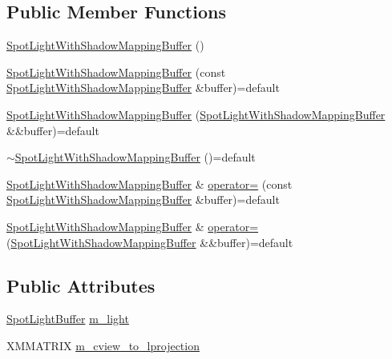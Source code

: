 \subsection*{Public Member Functions}
\begin{DoxyCompactItemize}
\item 
\hyperlink{structmage_1_1_spot_light_with_shadow_mapping_buffer_a96d597bc25801b19e38d3eefa0d662f1}{Spot\+Light\+With\+Shadow\+Mapping\+Buffer} ()
\item 
\hyperlink{structmage_1_1_spot_light_with_shadow_mapping_buffer_aa9078fd9b347d633b48fb8bbb330d54e}{Spot\+Light\+With\+Shadow\+Mapping\+Buffer} (const \hyperlink{structmage_1_1_spot_light_with_shadow_mapping_buffer}{Spot\+Light\+With\+Shadow\+Mapping\+Buffer} \&buffer)=default
\item 
\hyperlink{structmage_1_1_spot_light_with_shadow_mapping_buffer_a933982cf023e052a21da2009f48d9ae1}{Spot\+Light\+With\+Shadow\+Mapping\+Buffer} (\hyperlink{structmage_1_1_spot_light_with_shadow_mapping_buffer}{Spot\+Light\+With\+Shadow\+Mapping\+Buffer} \&\&buffer)=default
\item 
\hyperlink{structmage_1_1_spot_light_with_shadow_mapping_buffer_ae96fbec68878382084dce0147da2eb72}{$\sim$\+Spot\+Light\+With\+Shadow\+Mapping\+Buffer} ()=default
\item 
\hyperlink{structmage_1_1_spot_light_with_shadow_mapping_buffer}{Spot\+Light\+With\+Shadow\+Mapping\+Buffer} \& \hyperlink{structmage_1_1_spot_light_with_shadow_mapping_buffer_ad22e5a39ca0f4f313de923876c02b2ac}{operator=} (const \hyperlink{structmage_1_1_spot_light_with_shadow_mapping_buffer}{Spot\+Light\+With\+Shadow\+Mapping\+Buffer} \&buffer)=default
\item 
\hyperlink{structmage_1_1_spot_light_with_shadow_mapping_buffer}{Spot\+Light\+With\+Shadow\+Mapping\+Buffer} \& \hyperlink{structmage_1_1_spot_light_with_shadow_mapping_buffer_abb7324a9b98123e701b1e61cc7720cf9}{operator=} (\hyperlink{structmage_1_1_spot_light_with_shadow_mapping_buffer}{Spot\+Light\+With\+Shadow\+Mapping\+Buffer} \&\&buffer)=default
\end{DoxyCompactItemize}
\subsection*{Public Attributes}
\begin{DoxyCompactItemize}
\item 
\hyperlink{structmage_1_1_spot_light_buffer}{Spot\+Light\+Buffer} \hyperlink{structmage_1_1_spot_light_with_shadow_mapping_buffer_adf2a7b3790e5ca40141a3bfbd9de19bb}{m\+\_\+light}
\item 
X\+M\+M\+A\+T\+R\+IX \hyperlink{structmage_1_1_spot_light_with_shadow_mapping_buffer_a9f265c3662e441dc1d32dd793198ca5f}{m\+\_\+cview\+\_\+to\+\_\+lprojection}
\end{DoxyCompactItemize}
